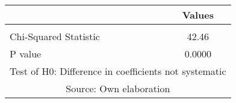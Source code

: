
{
\begin{tabular}{lc} \hline
 & Values \\ \hline
 &  \\
Chi-Squared Statistic & 42.46 \\
P value & 0.0000 \\ \hline
\multicolumn{2}{c}{Test of H0: Difference in coefficients not systematic} \\
\multicolumn{2}{c}{Source: Own elaboration} \\
\end{tabular}
}
